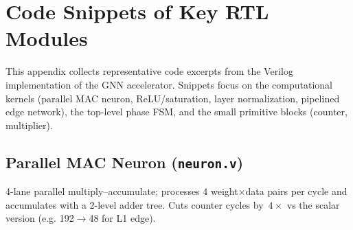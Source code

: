 \documentclass[10pt,a4paper]{article}
\begin{document}
\appendix
\section{Code Snippets of Key RTL Modules}
\label{appendix:rtl}

This appendix collects representative code excerpts from the Verilog
implementation of the GNN accelerator. Snippets focus on the
computational kernels (parallel MAC neuron, ReLU/saturation, layer
normalization, pipelined edge network), the top-level phase FSM, and
the small primitive blocks (counter, multiplier).

\subsection{Parallel MAC Neuron (\texttt{neuron.v})}
4-lane parallel multiply--accumulate; processes 4 weight$\times$data
pairs per cycle and accumulates with a 2-level adder tree. Cuts counter
cycles by~$4\times$ vs the scalar version (e.g. 192$\to$48 for L1 edge).
\end{document}
